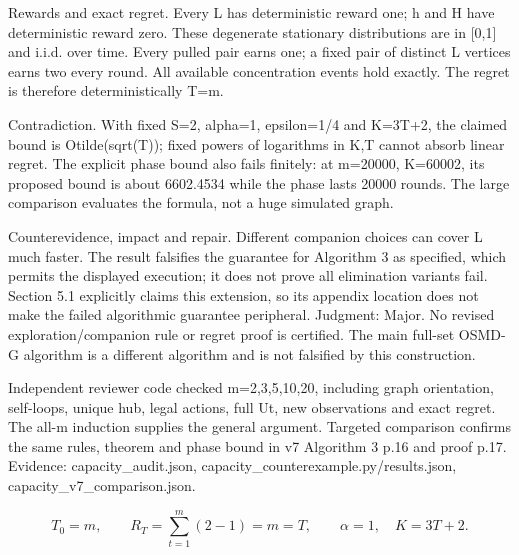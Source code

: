 \documentclass[10pt]{article}
\begin{document}
Rewards and exact regret. Every L has deterministic reward one; h and H have deterministic reward zero. These degenerate stationary distributions are in [0,1] and i.i.d. over time. Every pulled pair earns one; a fixed pair of distinct L vertices earns two every round. All available concentration events hold exactly. The regret is therefore deterministically T=m.\par
Contradiction. With fixed S=2, alpha=1, epsilon=1/4 and K=3T+2, the claimed bound is Otilde(sqrt(T)); fixed powers of logarithms in K,T cannot absorb linear regret. The explicit phase bound also fails finitely: at m=20000, K=60002, its proposed bound is about 6602.4534 while the phase lasts 20000 rounds. The large comparison evaluates the formula, not a huge simulated graph.\par
Counterevidence, impact and repair. Different companion choices can cover L much faster. The result falsifies the guarantee for Algorithm 3 as specified, which permits the displayed execution; it does not prove all elimination variants fail. Section 5.1 explicitly claims this extension, so its appendix location does not make the failed algorithmic guarantee peripheral. Judgment: Major. No revised exploration/companion rule or regret proof is certified. The main full-set OSMD-G algorithm is a different algorithm and is not falsified by this construction.\par
Independent reviewer code checked m=2,3,5,10,20, including graph orientation, self-loops, unique hub, legal actions, full Ut, new observations and exact regret. The all-m induction supplies the general argument. Targeted comparison confirms the same rules, theorem and phase bound in v7 Algorithm 3 p.16 and proof p.17. Evidence: capacity\_audit.json, capacity\_counterexample.py/results.json, capacity\_v7\_comparison.json.\par
\[T_0=m,\qquad R_T=\sum_{t=1}^{m}(2-1)=m=T,\qquad \alpha=1,\quad K=3T+2.\]\par
\end{document}
